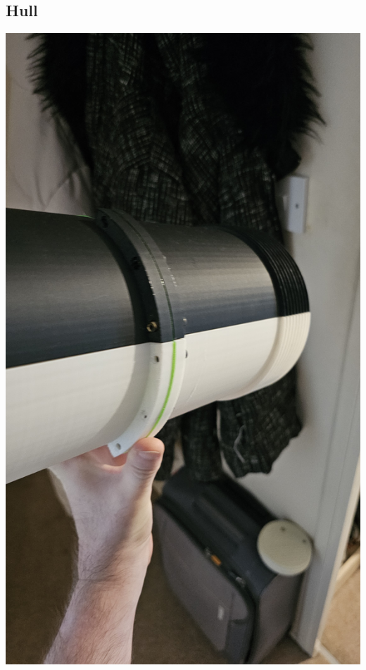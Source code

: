 \documentclass[11pt,a4paper,titlepage]{report}
\begin{document}
	\subsection{Hull}\label{appendix:images_hull}
	\begin{center}
		\label{picture:images_hull_1}
		\includegraphics[width=\linewidth]{assets/AUV_Hull1.jpg}
	\end{center}
\end{document}
